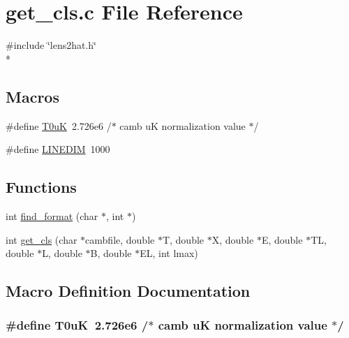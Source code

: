 \section{get\-\_\-cls.\-c File Reference}
\label{rng_2test__param__reader_2get__cls_8c}
{\ttfamily \#include \char`\"{}lens2hat.\-h\char`\"{}}\\*
\subsection*{Macros}
\begin{DoxyCompactItemize}
\item 
\#define \hyperlink{rng_2test__param__reader_2get__cls_8c_a08cd9bfd4b050dde02e833f33461b671}{T0u\-K}~2.\-726e6           /$\ast$ camb u\-K normalization value $\ast$/
\item 
\#define \hyperlink{rng_2test__param__reader_2get__cls_8c_aaa0c0616e8717ea9c76dd7904f655152}{L\-I\-N\-E\-D\-I\-M}~1000
\end{DoxyCompactItemize}
\subsection*{Functions}
\begin{DoxyCompactItemize}
\item 
int \hyperlink{rng_2test__param__reader_2get__cls_8c_ad0d22c8f81de4958118034489dcf9038}{find\-\_\-format} (char $\ast$, int $\ast$)
\item 
int \hyperlink{rng_2test__param__reader_2get__cls_8c_adcf8d34c58e37d76212faa5cf10061a8}{get\-\_\-cls} (char $\ast$cambfile, double $\ast$T, double $\ast$X, double $\ast$E, double $\ast$T\-L, double $\ast$L, double $\ast$B, double $\ast$E\-L, int lmax)
\end{DoxyCompactItemize}


\subsection{Macro Definition Documentation}
\subsubsection[{T0u\-K}]{\setlength{\rightskip}{0pt plus 5cm}\#define T0u\-K~2.\-726e6           /$\ast$ camb u\-K normalization value $\ast$/}\label{rng_2test__param__reader_2get__cls_8c_a08cd9bfd4b050dde02e833f33461b671}


